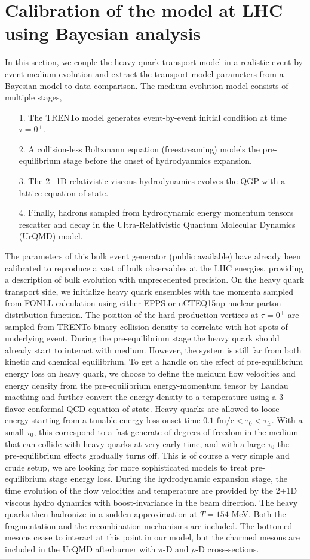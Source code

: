 \documentclass[aps, prc, reprint, amsmath, groupedaddress, nofootinbib]{revtex4-1}
\begin{document}
\section{Calibration of the model at LHC using Bayesian analysis}\label{section:calibration}
In this section, we couple the heavy quark transport model in a realistic event-by-event medium evolution and extract the transport model parameters  from a Bayesian model-to-data comparison.
The medium evolution model consists of multiple stages,
\begin{itemize}
\item[1.] The TRENTo model generates event-by-event initial condition at time $\tau = 0^+$. 
\item[2.] A collision-less Boltzmann equation (freestreaming) models the pre-equilibrium stage before the onset of hydrodyanmics expansion.
\item[3.] The 2+1D relativistic viscous hydrodynamics evolves the QGP with a lattice equation of state.
\item[4.] Finally, hadrons sampled from hydrodynamic energy momentum tensors rescatter and decay in the Ultra-Relativistic Quantum Molecular Dynamics (UrQMD) model.
\end{itemize}
The parameters of this bulk event generator (public available) have already been calibrated to reproduce a vast of bulk observables at the LHC energies, providing a description of bulk evolution with unprecedented precision.
On the heavy quark transport side, we initialize heavy quark ensembles with the momenta sampled from FONLL calculation using either EPPS or nCTEQ15np nuclear parton distribution function. 
The position of the hard production vertices at $\tau = 0^+$ are sampled from TRENTo binary collision density to correlate with hot-spots of  underlying event. 
During the pre-equilibrium stage the heavy quark should already start to interact with medium.
However, the system is still far from both kinetic and chemical equilibrium.
To get a handle on the effect of pre-equilibrium energy loss on heavy quark, we choose to define the meidum flow velocities and energy density from the pre-equilibrium energy-momentum tensor by Landau macthing and further convert the energy density to a temperature using a 3-flavor conformal QCD equation of state. 
Heavy quarks are allowed to loose energy starting from a tunable energy-loss onset time $0.1\textrm{ fm/c} < \tau_0 < \tau_{\textrm{fs}}$. 
With a small $\tau_0$, this correspond to a fast generate of degrees of freedom in the medium that can collide with heavy quarks at very early time, and with a large $\tau_0$ the pre-equilibrium effects gradually turns off.
This is of course a very simple and crude setup, we are looking for more sophisticated models to treat pre-equilibrium stage energy loss.
During the hydrodynamic expansion stage, the time evolution of the flow velocities and temperature are provided by the 2+1D viscous hydro dynamics with boost-invariance in the beam direction.
The heavy quarks then hadronize in a sudden-approximation at $T = 154$ MeV.
Both the fragmentation and the recombination mechanisms are included. 
The bottomed mesons cease to interact at this point in our model, but the charmed mesons are included in the UrQMD afterburner with $\pi$-D and $\rho$-D cross-sections.
\end{document}

